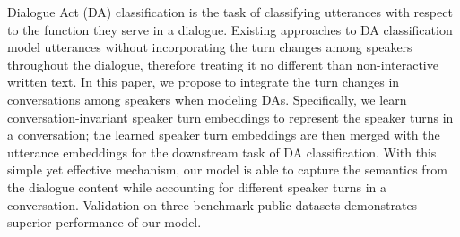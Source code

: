 Dialogue Act (DA) classification is the task of classifying utterances with respect to the function they serve in a dialogue. Existing approaches to DA classification model utterances without incorporating the turn changes among speakers throughout the dialogue, therefore treating it no different than non-interactive written text. In this paper, we propose to integrate the turn changes in conversations among speakers when modeling DAs. Specifically, we learn conversation-invariant speaker turn embeddings to represent the speaker turns in a conversation; the learned speaker turn embeddings are then merged with the utterance embeddings for the downstream task of DA classification. With this simple yet effective mechanism, our model is able to capture the semantics from the dialogue content while accounting for different speaker turns in a conversation. Validation on three benchmark public datasets demonstrates superior performance of our model.
